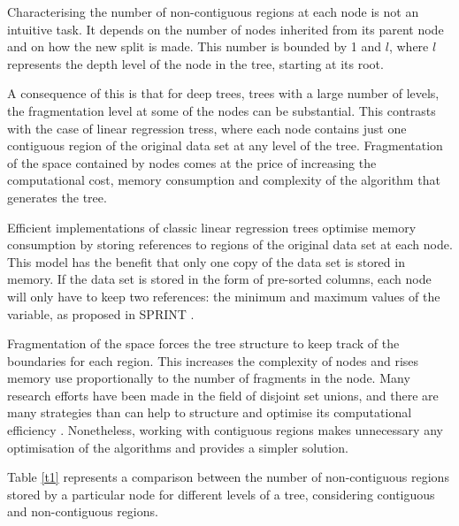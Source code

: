 \documentclass[times,twocolumn,final,authoryear]{elsarticle}
\begin{document}
%
%

Characterising the number of non-contiguous regions at each node is not an intuitive task. It depends on the number of nodes inherited from its parent node and on how the new split is made. This number is bounded by 1 and $l$, where $l$ represents the depth level of the node in the tree, starting at its root.

A consequence of this is that for deep trees, trees with a large number of levels, the fragmentation level at some of the nodes can be substantial. This contrasts with the case of linear regression tress, where each node contains just one contiguous region of the original data set at any level of the tree. Fragmentation of the space contained by nodes comes at the price of increasing the computational cost, memory consumption and complexity of the algorithm that generates the tree.

Efficient implementations of classic linear regression trees optimise memory consumption by storing references to regions of the original data set at each node. This model has the benefit that only one copy of the data set is stored in memory. If the data set is stored in the form of pre-sorted columns, each node will only have to keep two references: the minimum and maximum values of the variable, as proposed in SPRINT \citep{Shareretal1996}.

Fragmentation of the space forces the tree structure to keep track of the boundaries for each region. This increases the complexity of nodes and rises memory use proportionally to the number of fragments in the node. Many research efforts have been made in the field of disjoint set unions, and there are many strategies than can help to structure and optimise its computational efficiency \citep{Galil1991}. Nonetheless, working with contiguous regions makes unnecessary any optimisation of the algorithms and provides a simpler solution.

Table \ref{t1} represents a comparison between the number of non-contiguous regions stored by a particular node for different levels of a tree, considering contiguous and non-contiguous regions.
\end{document}
